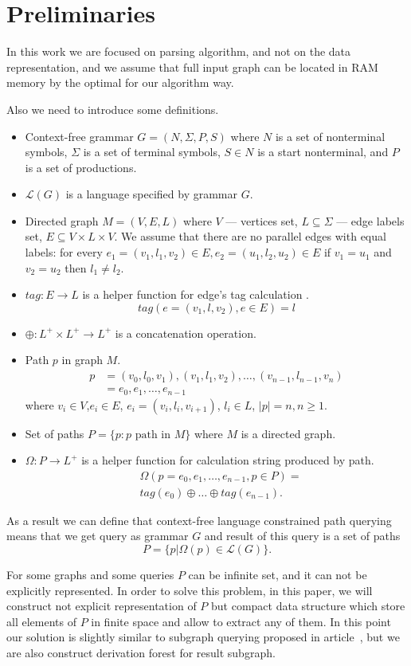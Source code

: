 \section{Preliminaries}

In this work we are focused on parsing algorithm, and not on the data representation, and we assume that full input graph can be located in RAM memory by the optimal for our algorithm way.

Also we need to introduce some definitions.
\begin{itemize}
  \item Context-free grammar $G=(N, \Sigma, P, S)$ where $N$ is a set of nonterminal symbols, $\Sigma$ is a set of terminal symbols, $S \in N$ is a start nonterminal, and $P$ is a set of productions. 
  \item $\mathcal{L}(G)$ is a language specified by grammar $G$.
  \item Directed graph $M = (V,E,L)$ where $V$ --- vertices set, $L \subseteq \Sigma$ --- edge labels set, $E\subseteq V\times L\times V$. 
  We assume that there are no parallel edges with equal labels: for every $e_1=(v_1,l_1,v_2) \in E, e_2=(u_1,l_2,u_2) \in E$ if $v_1 = u_1$ and $v_2 = u_2$ then $l_1 \neq l_2$.
  \item $tag: E \rightarrow L$ is a helper function for edge's tag calculation . $$tag(e = (v_1,l,v_2), e \in E) = l$$
  \item $\oplus: L^+ \times L^+ \rightarrow L^+$ is a concatenation operation.
  \item Path $p$ in graph $M$. 
  \begin{align*}
   p &= (v_0,l_0,v_1),(v_1,l_1,v_2),\dots,(v_{n-1},l_{n-1},v_n) \\
     &= e_0,e_1,\dots,e_{n-1}
  \end{align*}
  where $v_i \in V$,$e_i \in E$, $e_i=(v_i,l_i,v_{i+1})$, $l_i \in L$, $|p| = n, n \geq 1$. 
  \item Set of paths $P = \{p: p \text{ path in } M\}$ where $M$ is a directed graph.
  \item $\Omega: P \rightarrow L^+$ is a helper function for calculation string produced by path. 
  \begin{align*}
  & \Omega(p = e_{0},e_{1},\dots,e_{n-1}, p \in P) = \\
  & tag (e_{0}) \oplus \dots \oplus tag (e_{n-1}).
  \end{align*}
\end{itemize}

As a result we can define that context-free language constrained path querying means that we get query as grammar $G$ and result of this query is a set of paths $$P=\{p|\Omega(p) \in \mathcal{L}(G)\}.$$

For some graphs and some queries $P$ can be infinite set, and it can not be explicitly represented. 
In order to solve this problem, in this paper, we will construct not explicit representation of $P$ but compact data structure which store all elements of $P$ in finite space and allow to extract any of them.
In this point our solution is slightly similar to subgraph querying proposed in article~\cite{GraphQueryWithEarley}, but we are also construct derivation forest for result subgraph.
